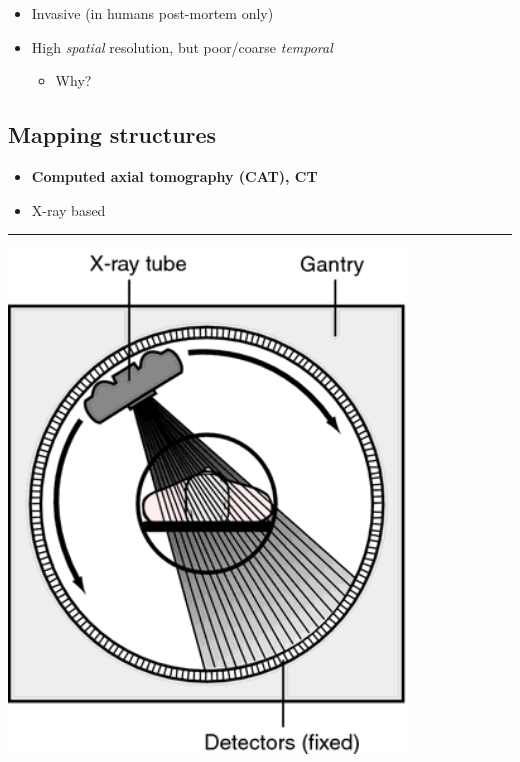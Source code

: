 \documentclass[]{article}
\providecommand{\tightlist}{%
  \setlength{\itemsep}{0pt}\setlength{\parskip}{0pt}}
\begin{document}
\begin{itemize}
\tightlist
\item
  Invasive (in humans post-mortem only)
\item
  High \emph{spatial} resolution, but poor/coarse \emph{temporal}

  \begin{itemize}
  \tightlist
  \item
    Why?
  \end{itemize}
\end{itemize}

\hypertarget{mapping-structures-1}{%
\subsection{Mapping structures}\label{mapping-structures-1}}

\begin{itemize}
\tightlist
\item
  \textbf{Computed axial tomography (CAT), CT}
\item
  X-ray based
\end{itemize}

\begin{center}\rule{0.5\linewidth}{\linethickness}\end{center}

\begin{center}\includegraphics[width=400px]{img/tomography} \end{center}
\end{document}
